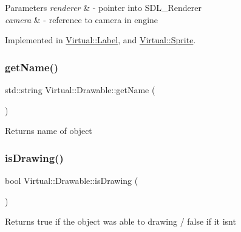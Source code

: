 \begin{DoxyParams}{Parameters}
{\em renderer} & -\/ pointer into S\+D\+L\+\_\+\+Renderer \\
\hline
{\em camera} & -\/ reference to camera in engine \\
\hline
\end{DoxyParams}


Implemented in \hyperlink{class_virtual_1_1_label_a077d7852f09f940a9932f63fb616351c}{Virtual\+::\+Label}, and \hyperlink{class_virtual_1_1_sprite_a57f581e0307ab2b2dd7c6922dba2a057}{Virtual\+::\+Sprite}.

\hypertarget{class_virtual_1_1_drawable_a6b00363f9db9c6b0e1bf09e250f687cb}{}\label{class_virtual_1_1_drawable_a6b00363f9db9c6b0e1bf09e250f687cb} 
\subsubsection{\texorpdfstring{get\+Name()}{getName()}}
{\footnotesize\ttfamily std\+::string Virtual\+::\+Drawable\+::get\+Name (\begin{DoxyParamCaption}{ }\end{DoxyParamCaption})}

\begin{DoxyReturn}{Returns}
name of object 
\end{DoxyReturn}
\hypertarget{class_virtual_1_1_drawable_a47902855528332fd79595db7dacca2ed}{}\label{class_virtual_1_1_drawable_a47902855528332fd79595db7dacca2ed} 
\subsubsection{\texorpdfstring{is\+Drawing()}{isDrawing()}}
{\footnotesize\ttfamily bool Virtual\+::\+Drawable\+::is\+Drawing (\begin{DoxyParamCaption}{ }\end{DoxyParamCaption})}

\begin{DoxyReturn}{Returns}
true if the object was able to drawing / false if it isn\textquotesingle{}t 
\end{DoxyReturn}
\hypertarget{class_virtual_1_1_drawable_a7901d5ac8f7ebed5e3d5773c9699ca7c}{}\label{class_virtual_1_1_drawable_a7901d5ac8f7ebed5e3d5773c9699ca7c} 
